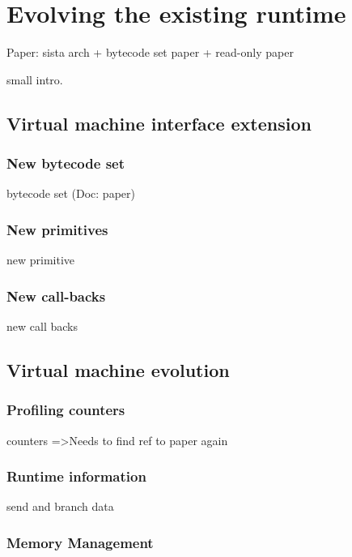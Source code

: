 \documentclass[a4paper,12pt,twoside]{../includes/ThesisStyle}
\begin{document}
\fi

\chapter{Evolving the existing runtime}
\label{chap:archImpl}
\minitoc

Paper: sista arch + bytecode set paper + read-only paper

small intro. 

\section{Virtual machine interface extension}

\subsection{New bytecode set}

bytecode set (Doc: paper)

\subsection{New primitives}

new primitive

\subsection{New call-backs}

new call backs

\section{Virtual machine evolution}

\subsection{Profiling counters}
counters
=>Needs to find ref to paper again

\subsection{Runtime information}

send and branch data

\subsection{Memory Management}
\end{document}
